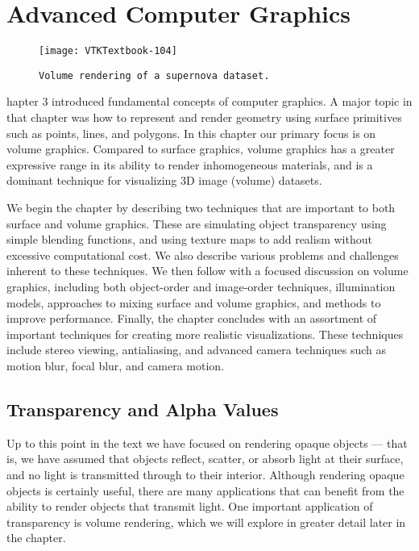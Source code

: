 \chapter{Advanced Computer Graphics}
\label{chap:advanced_computer_graphics}

\begin{figure}[ht]
	\hfill
	\begin{minipage}{0.5\textwidth}
		\centering
		\texttt{[image: VTKTextbook-104]}\\
		\caption*{\texttt{Volume rendering of a supernova dataset.}}
	\end{minipage}
\end{figure}

hapter 3 introduced fundamental concepts of computer graphics.
A major topic in that chapter was how to represent and render geometry using surface primitives such as points, lines, and polygons.
In this chapter our primary focus is on volume graphics.
Compared to surface graphics, volume graphics has a greater expressive range in its ability to render inhomogeneous materials, and is a dominant technique for visualizing 3D image (volume) datasets.

We begin the chapter by describing two techniques that are important to both surface and volume graphics.
These are simulating object transparency using simple blending functions, and using texture maps to add realism without excessive computational cost.
We also describe various problems and challenges inherent to these techniques.
We then follow with a focused discussion on volume graphics, including both object-order and image-order techniques, illumination models, approaches to mixing surface and volume graphics, and methods to improve performance.
Finally, the chapter concludes with an assortment of important techniques for creating more realistic visualizations.
These techniques include stereo viewing, antialiasing, and advanced camera techniques such as motion blur, focal blur, and camera motion.

\section{Transparency and Alpha Values}
\label{sec:transparency_alpha}

Up to this point in the text we have focused on rendering opaque objects — that is, we have assumed that objects reflect, scatter, or absorb light at their surface, and no light is transmitted through to their interior. Although rendering opaque objects is certainly useful, there are many applications that can benefit from the ability to render objects that transmit light. One important
application of transparency is volume rendering, which we will explore in greater detail later in the chapter.

